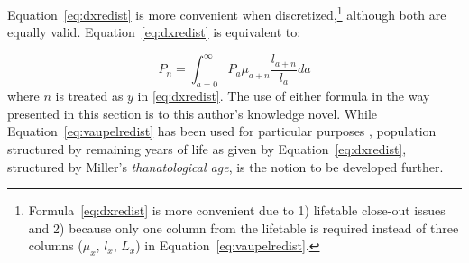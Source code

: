 Equation~\eqref{eq:dxredist} is more convenient when 
discretized,\footnote{Formula~\eqref{eq:dxredist} is more convenient due to 1)
lifetable close-out issues and 2) because only one column from the lifetable is required instead 
of three columns ($\mu_x$, $l_x$, $L_x$) in
Equation~\eqref{eq:vaupelredist}. } although both are equally valid.
Equation~\ref{eq:dxredist} is equivalent to:

\begin{equation}
P_n = \int _{a=0} ^\infty P_a \mu_{a+n} \frac{l_{a+n}}{l_a} da
\end{equation}
where $n$ is treated as $y$ in \ref{eq:dxredist}.
The use of either formula in the way presented in this section is to this
author's knowledge novel. While Equation~\eqref{eq:vaupelredist} has
been used for particular purposes \citep{miller2001increasing}, population
structured by remaining years of life as given by Equation~\eqref{eq:dxredist},
structured by Miller's \textit{thanatological age}, is the notion
to be developed further.



